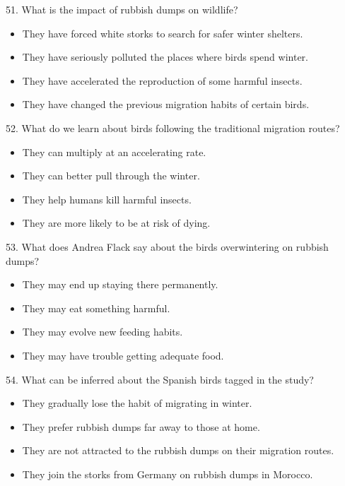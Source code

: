 \documentclass[UTF8,11pt]{ctexart}
\begin{document}
51. What is the impact of rubbish dumps on wildlife?


\begin{itemize}[leftmargin=2em,itemsep=.2em,topsep=.4em]\item[A.] They have forced white storks to search for safer winter shelters.
\item[B.] They have seriously polluted the places where birds spend winter.
\item[C.] They have accelerated the reproduction of some harmful insects.
\item[D.] They have changed the previous migration habits of certain birds.
\end{itemize}

52. What do we learn about birds following the traditional migration routes?


\begin{itemize}[leftmargin=2em,itemsep=.2em,topsep=.4em]\item[A.] They can multiply at an accelerating rate.
\item[B.] They can better pull through the winter.
\item[C.] They help humans kill harmful insects.
\item[D.] They are more likely to be at risk of dying.
\end{itemize}

53. What does Andrea Flack say about the birds overwintering on rubbish dumps?


\begin{itemize}[leftmargin=2em,itemsep=.2em,topsep=.4em]\item[A.] They may end up staying there permanently.
\item[B.] They may eat something harmful.
\item[C.] They may evolve new feeding habits.
\item[D.] They may have trouble getting adequate food.
\end{itemize}

54. What can be inferred about the Spanish birds tagged in the study?


\begin{itemize}[leftmargin=2em,itemsep=.2em,topsep=.4em]\item[A.] They gradually lose the habit of migrating in winter.
\end{itemize}

\begin{itemize}[leftmargin=2em,itemsep=.2em,topsep=.4em]\item[B.] They prefer rubbish dumps far away to those at home.
\item[C.] They are not attracted to the rubbish dumps on their migration routes.
\item[D.] They join the storks from Germany on rubbish dumps in Morocco.
\end{itemize}
\end{document}
